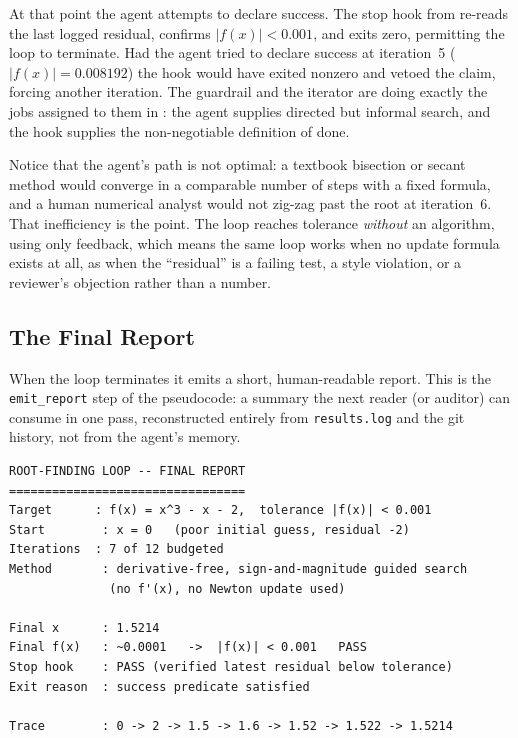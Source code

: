 At that point the agent attempts to declare success. The stop hook from
 re-reads the last logged residual, confirms
$|f(x)| < 0.001$, and exits zero, permitting the loop to terminate. Had the agent
tried to declare success at iteration~5 ($|f(x)|=0.008192$) the hook would have
exited nonzero and vetoed the claim, forcing another iteration. The guardrail and
the iterator are doing exactly the jobs assigned to them in :
the agent supplies directed but informal search, and the hook supplies the
non-negotiable definition of done.

\begin{remark}
Notice that the agent's path is not optimal: a textbook bisection or secant
method would converge in a comparable number of steps with a fixed formula, and a
human numerical analyst would not zig-zag past the root at iteration~6. That
inefficiency is the point. The loop reaches tolerance \emph{without} an algorithm,
using only feedback, which means the same loop works when no update formula exists
at all, as when the ``residual'' is a failing test, a style violation, or a
reviewer's objection rather than a number.
\end{remark}

\subsection{The Final Report}\label{subsec:rootfind-report}

When the loop terminates it emits a short, human-readable report. This is the
\texttt{emit\_report} step of the pseudocode: a summary the next reader (or
auditor) can consume in one pass, reconstructed entirely from \texttt{results.log}
and the git history, not from the agent's memory.

\begin{verbatim}
ROOT-FINDING LOOP -- FINAL REPORT
=================================
Target      : f(x) = x^3 - x - 2,  tolerance |f(x)| < 0.001
Start        : x = 0   (poor initial guess, residual -2)
Iterations  : 7 of 12 budgeted
Method       : derivative-free, sign-and-magnitude guided search
              (no f'(x), no Newton update used)

Final x      : 1.5214
Final f(x)   : ~0.0001   ->  |f(x)| < 0.001   PASS
Stop hook    : PASS (verified latest residual below tolerance)
Exit reason  : success predicate satisfied

Trace        : 0 -> 2 -> 1.5 -> 1.6 -> 1.52 -> 1.522 -> 1.5214
\end{verbatim}

